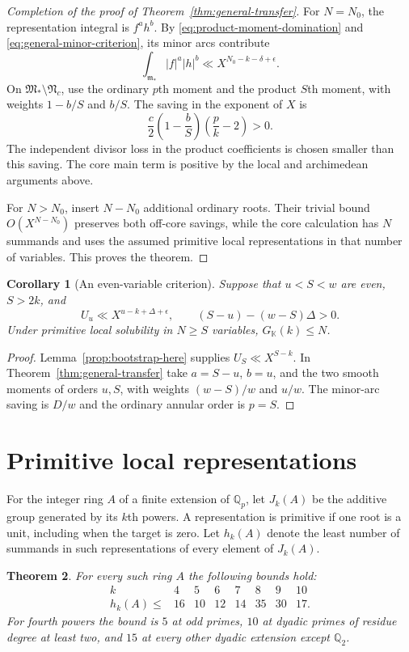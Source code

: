 \documentclass[11pt]{amsart}
\newtheorem{theorem}{Theorem}[section]
\newtheorem{corollary}[theorem]{Corollary}
\theoremstyle{definition}
\numberwithin{equation}{section}
\begin{document}
\begin{proof}[Completion of the proof of Theorem~\ref{thm:general-transfer}]
For $N=N_0$, the representation integral is $f^ah^b$.
By \eqref{eq:product-moment-domination} and
\eqref{eq:general-minor-criterion}, its minor arcs contribute
\[
 \int_{\mathfrak m_*}|f|^a|h|^b
 \ll X^{N_0-k-\delta+\epsilon}.
\]
On $\mathfrak M_*\setminus\mathfrak N_c$, use the ordinary
$p$th moment and the product $S$th moment, with weights
$1-b/S$ and $b/S$. The saving in the exponent of $X$ is
\[
 \frac c2\left(1-\frac bS\right)\left(\frac pk-2\right)>0.
\]
The independent divisor loss in the product coefficients is chosen
smaller than this saving. The core main term is positive by the
local and archimedean arguments above.

For $N>N_0$, insert $N-N_0$ additional ordinary roots. Their trivial
bound $O(X^{N-N_0})$ preserves both off-core savings, while the core
calculation has $N$ summands and uses the assumed primitive local
representations in that number of variables. This proves the theorem.
\end{proof}

\begin{corollary}[An even-variable criterion]
\label{cor:even-transfer}
Suppose that $u<S<w$ are even, $S>2k$, and
\[
 U_u\ll X^{u-k+\Delta+\epsilon},\qquad
 (S-u)-(w-S)\Delta>0.
\]
Under primitive local solubility in $N\ge S$ variables,
$G_{\mathbb K}(k)\le N$.
\end{corollary}
\begin{proof}
Lemma~\ref{prop:bootstrap-here} supplies $U_S\ll X^{S-k}$.
In Theorem~\ref{thm:general-transfer} take $a=S-u$, $b=u$,
and the two smooth moments of orders $u,S$, with weights
$(w-S)/w$ and $u/w$. The minor-arc saving is $D/w$ and the
ordinary annular order is $p=S$.
\end{proof}

\section{Primitive local representations}
\label{sec:local-solubility}\label{sec:higher-local-bounds}
For the integer ring $A$ of a finite extension of $\mathbb Q_p$,
let $J_k(A)$ be the additive group generated by its $k$th powers.
A representation is primitive if one root is a unit, including
when the target is zero. Let $h_k(A)$ denote the least number of
summands in such representations of every element of $J_k(A)$.

\begin{theorem}\label{thm:local-table}
For every such ring $A$ the following bounds hold:
\[
\begin{array}{c|rrrrrrr}
 k&4&5&6&7&8&9&10\\\hline
 h_k(A)\le&16&10&12&14&35&30&17.
\end{array}
\]
For fourth powers the bound is $5$ at odd primes, $10$ at dyadic
primes of residue degree at least two, and $15$ at every other
dyadic extension except $\mathbb Q_2$.
\end{theorem}
\end{document}
